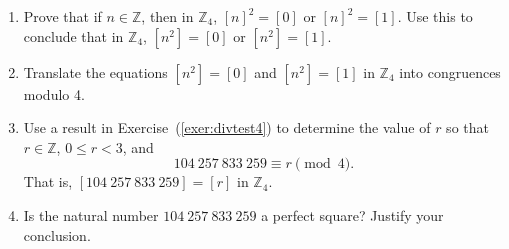 \begin{enumerate}
\begin{enumerate}
\item Prove that if  $n \in \mathbb{Z}$, then in  $\mathbb{Z}_4 $,  
$[ n ]^2  = [ 0 ]$  or  $[ n ]^2  = [ 1 ]$.  Use this to conclude that in  $\mathbb{Z}_4 $,  $[ {n^2 } ] = [ 0 ]$  or  $[ {n^2 } ] = [ 1 ]$.

\item Translate the equations  $\left[ {n^2 } \right] = [ 0 ]$ and   
$\left[ {n^2 } \right] = [ 1 ]$ in  $\mathbb{Z}_4 $ into congruences 
modulo 4.

\item Use a result in Exercise~(\ref{exer:divtest4}) to determine the value of  $r$  so that  
$r \in \mathbb{Z}$,  $0 \leq r < 3$, and  
\[
{104 \  257 \ 833 \ 259} \equiv r \pmod 4\!.
\]
That is,  $[ {104 \ 257 \ 833 \ 259} ] = [ r ]$ in  $\mathbb{Z}_4 $.

\item Is the natural number  $104 \ 257 \ 833 \ 259$  a perfect square?  Justify your conclusion.

\end{enumerate}


\end{enumerate}

\hbreak

\endinput


